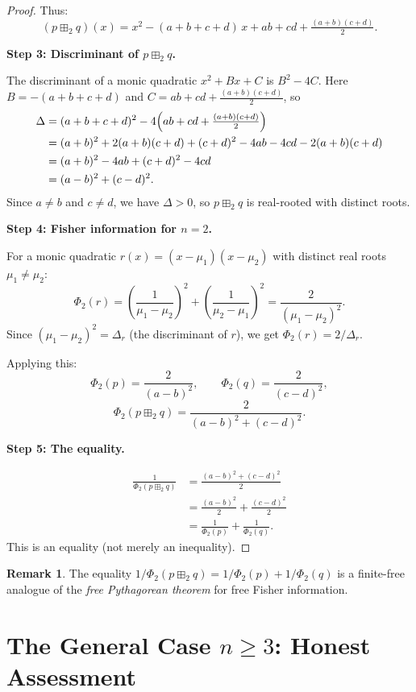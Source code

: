 \documentclass[12pt]{article}
\theoremstyle{definition}
\newtheorem{remark}[theorem]{Remark}
\begin{document}
\begin{proof}
Thus:
\[
  (p \boxplus_2 q)(x) = x^2 - (a+b+c+d)\,x + ab + cd + \tfrac{(a+b)(c+d)}{2}.
\]

\textbf{Step 3: Discriminant of $p \boxplus_2 q$.}

The discriminant of a monic quadratic $x^2 + Bx + C$ is $B^2 - 4C$. Here $B = -(a+b+c+d)$ and $C = ab + cd + \tfrac{(a+b)(c+d)}{2}$, so
\begin{align*}
  \Delta &= (a+b+c+d)^2 - 4\Bigl(ab + cd + \tfrac{(a+b)(c+d)}{2}\Bigr) \\
         &= (a+b)^2 + 2(a+b)(c+d) + (c+d)^2 - 4ab - 4cd - 2(a+b)(c+d) \\
         &= (a+b)^2 - 4ab + (c+d)^2 - 4cd \\
         &= (a-b)^2 + (c-d)^2.
\end{align*}
Since $a \neq b$ and $c \neq d$, we have $\Delta > 0$, so $p \boxplus_2 q$ is real-rooted with distinct roots.

\textbf{Step 4: Fisher information for $n=2$.}

For a monic quadratic $r(x) = (x - \mu_1)(x - \mu_2)$ with distinct real roots $\mu_1 \neq \mu_2$:
\[
  \Phi_2(r) = \left(\frac{1}{\mu_1 - \mu_2}\right)^2 + \left(\frac{1}{\mu_2 - \mu_1}\right)^2 = \frac{2}{(\mu_1 - \mu_2)^2}.
\]
Since $(\mu_1 - \mu_2)^2 = \Delta_r$ (the discriminant of $r$), we get $\Phi_2(r) = 2/\Delta_r$.

Applying this:
\[
  \Phi_2(p) = \frac{2}{(a-b)^2}, \qquad \Phi_2(q) = \frac{2}{(c-d)^2},
\]
\[
  \Phi_2(p \boxplus_2 q) = \frac{2}{(a-b)^2 + (c-d)^2}.
\]

\textbf{Step 5: The equality.}

\begin{align*}
  \frac{1}{\Phi_2(p \boxplus_2 q)}
  &= \frac{(a-b)^2 + (c-d)^2}{2} \\
  &= \frac{(a-b)^2}{2} + \frac{(c-d)^2}{2} \\
  &= \frac{1}{\Phi_2(p)} + \frac{1}{\Phi_2(q)}.
\end{align*}
This is an equality (not merely an inequality).
\end{proof}

\begin{remark}
The equality $1/\Phi_2(p \boxplus_2 q) = 1/\Phi_2(p) + 1/\Phi_2(q)$ is a finite-free analogue of the \emph{free Pythagorean theorem} for free Fisher information.
\end{remark}

\section{The General Case $n \geq 3$: Honest Assessment}
\end{document}
